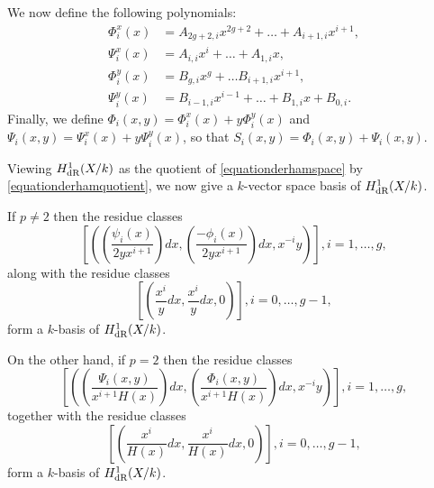 We now define the following polynomials:
    \begin{equation}\label{equationsplittingphiandpsi}
    \begin{split}
    \Phi_i^x(x) & =  A_{2g+2, i}x^{2g+2} + \ldots + A_{i+1, i}x^{i+1}, \\
    \Psi_i^x(x) & =  A_{i,i}x^i + \ldots + A_{1,i}x, \\
    \Phi_i^y(x) & =  B_{g,i}x^g + \ldots B_{i+1,i}x^{i+1}, \\
    \Psi_i^y(x) & =  B_{i-1,i}x^{i-1} + \ldots + B_{1,i}x + B_{0,i}.
    \end{split}
    \end{equation}
Finally, we define $\Phi_i(x,y) = \Phi_i^x(x) + y \Phi^y_i(x)$ and $\Psi_i(x,y) = \Psi_i^x(x) + y \Psi_i^y(x)$, so that $S_i(x,y) = \Phi_i(x,y) + \Psi_i(x,y)$.

Viewing $H_{\text {dR}}^1(X/k)$ as the quotient of \eqref{equationderhamspace} by \eqref{equationderhamquotient}, we now give a $k$-vector space basis of $H_{\text {dR}}^1(X/k)$.

    \begin{thm}\label{theorembasisofderham}
    If $p \neq 2$ then the residue classes 
        \begin{equation}\label{equationhonebasiselementofderhampnot2}
         \left[ \left( \left( \frac{\psi_i(x)}{2yx^{i+1}}\right) dx, \left(\frac{-\phi_i(x)}{2yx^{i+1}}\right) dx, x^{-i}y \right)\right] , i=1, \ldots ,g,
        \end{equation}
    along with the residue classes 
        \begin{equation}\label{equationhzerobasiselementofderhampnot2}
         \left[ \left( \frac{x^{i}}{y} dx , \frac{x^{i}}{y} dx, 0 \right)\right] , i = 0,\ldots ,g-1,
        \end{equation}
    form a $k$-basis of $H_{\text {dR}}^1(X/k)$.
    
    On the other hand, if $p=2$ then the residue classes 
        \begin{equation}\label{equationhonebasiselementofderhampis2}
        \left[ \left( \left(\frac{\Psi_i(x,y)}{x^{i+1}H(x)}\right) dx, \left( \frac{\Phi_i(x,y)}{x^{i+1}H(x)} \right) dx, x^{-i}y \right)\right], i =1, \ldots , g,
        \end{equation}
    together with the residue classes 
        \begin{equation}\label{equationhzerobasiselementofderhampis2}
        \left[ \left( \frac{x^{i}}{H(x)} dx, \frac{x^{i}}{H(x)} dx, 0 \right)\right], i=0, \ldots, g-1,
        \end{equation}
    form a $k$-basis of $H_{\text {dR}}^1(X/k)$.
    \end{thm}

